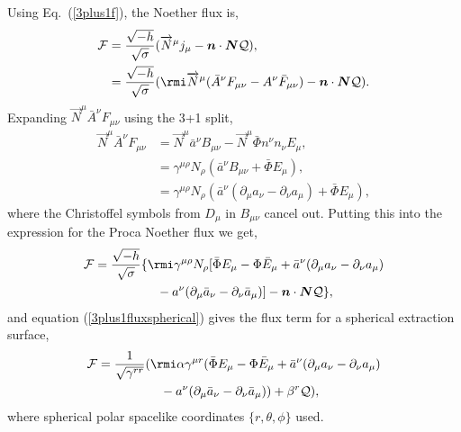  Using Eq.~(\ref{3plus1f}), the Noether flux is,
\begin{align}
\mathcal{F} &= \frac{\sqrt{-h}}{\sqrt{\sigma}}(\overrightarrow{N}^\mu j_\mu - \bs{n} \cdot \bs{N}  \mathcal{Q}), \\
 &= \frac{\sqrt{-h}}{\sqrt{\sigma}} ( \rmi\overrightarrow{N}^\mu (\bar{A}^\nu F_{\mu\nu} - A^\nu \bar{F}_{\mu\nu}) - \bs{n} \cdot \bs{N}  \mathcal{Q}).
 \end{align}
 Expanding $\overrightarrow{N}^\mu \bar{A}^\nu F_{\mu\nu}$ using the 3+1 split,
 \begin{align}
 \overrightarrow{N}^\mu \bar{A}^\nu F_{\mu\nu} &= \overrightarrow{N}^\mu \bar{a}^\nu B_{\mu\nu} - \overrightarrow{N}^\mu\bar{\Phi} n^\nu n_\nu E_\mu, \\
                            &= \gamma^{\mu\rho }{N}_\rho( \bar{a}^\nu B_{\mu\nu} +  \bar{\Phi}E_\mu),\\
                            &= \gamma^{\mu\rho }{N}_\rho( \bar{a}^\nu (\partial_\mu a_\nu - \partial_\nu a_\mu) +  \bar{\Phi}E_\mu),
 \end{align}
 where the Christoffel symbols from $D_\mu$ in $B_{\mu\nu}$ cancel out. Putting this into the expression for the Proca Noether flux we get,
 \begin{align}
  \begin{split}\mathcal{F}&= \frac{\sqrt{-h}}{\sqrt{\sigma}} \{ \rmi\gamma^{\mu\rho}{N}_\rho [\bar{\Phi} E_\mu  -\Phi  \bar{E}_{\mu} +\bar{a}^\nu (\partial_\mu a_\nu - \partial_\nu a_\mu) \\ &\quad\quad\quad\quad\quad-  a^\nu (\partial_\mu \bar{a}_\nu - \partial_\nu \bar{a}_\mu)] - \bs{n} \cdot \bs{N}  \mathcal{Q}\},\end{split} 
 \end{align}
 and equation (\ref{3plus1fluxspherical}) gives the flux term for a spherical extraction surface,
 \begin{align} \begin{split}
\mathcal{F}&= \frac{1}{\sqrt{\gamma^{rr}}} ( \rmi\alpha\gamma^{\mu r} ( \bar{\Phi} E_\mu - {\Phi} \bar{E}_\mu + \bar{a}^\nu (\partial_\mu a_\nu - \partial_\nu a_\mu)  \\&\quad\quad\quad\quad\quad- {a}^\nu (\partial_\mu \bar{a}_\nu - \partial_\nu \bar{a}_\mu) ) + \beta^r  \mathcal{Q}),
 \end{split}\end{align}
 where spherical polar spacelike coordinates $\{r,\theta,\phi\}$ used.













